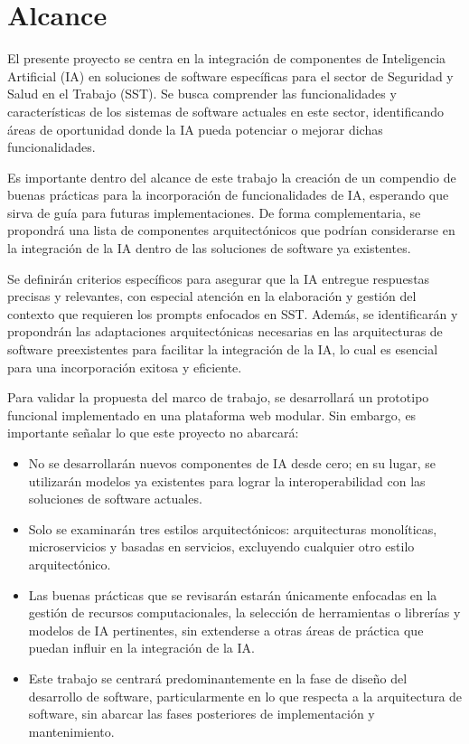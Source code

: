 \section{Alcance}
\label{sec:alcance}
El presente proyecto se centra en la integración de componentes de Inteligencia Artificial (IA) en soluciones de software específicas para el sector de Seguridad y Salud en el Trabajo (SST). Se busca comprender las funcionalidades y características de los sistemas de software actuales en este sector, identificando áreas de oportunidad donde la IA pueda potenciar o mejorar dichas funcionalidades.

Es importante dentro del alcance de este trabajo la creación de un compendio de buenas prácticas para la incorporación de funcionalidades de IA, esperando que sirva de guía para futuras implementaciones. De forma complementaria, se propondrá una lista de componentes arquitectónicos que podrían considerarse en la integración de la IA dentro de las soluciones de software ya existentes.

Se definirán criterios específicos para asegurar que la IA entregue respuestas precisas y relevantes, con especial atención en la elaboración y gestión del contexto que requieren los prompts enfocados en SST. Además, se identificarán y propondrán las adaptaciones arquitectónicas necesarias en las arquitecturas de software preexistentes para facilitar la integración de la IA, lo cual es esencial para una incorporación exitosa y eficiente.

Para validar la propuesta del marco de trabajo, se desarrollará un prototipo funcional implementado en una plataforma web modular. Sin embargo, es importante señalar lo que este proyecto no abarcará:
\begin{itemize}
    \item No se desarrollarán nuevos componentes de IA desde cero; en su lugar, se utilizarán modelos ya existentes para lograr la interoperabilidad con las soluciones de software actuales.
    \item Solo se examinarán tres estilos arquitectónicos: arquitecturas monolíticas, microservicios y basadas en servicios, excluyendo cualquier otro estilo arquitectónico.
    \item Las buenas prácticas que se revisarán estarán únicamente enfocadas en la gestión de recursos computacionales, la selección de herramientas o librerías y modelos de IA pertinentes, sin extenderse a otras áreas de práctica que puedan influir en la integración de la IA.
    \item Este trabajo se centrará predominantemente en la fase de diseño del desarrollo de software, particularmente en lo que respecta a la arquitectura de software, sin abarcar las fases posteriores de implementación y mantenimiento.
\end{itemize}

